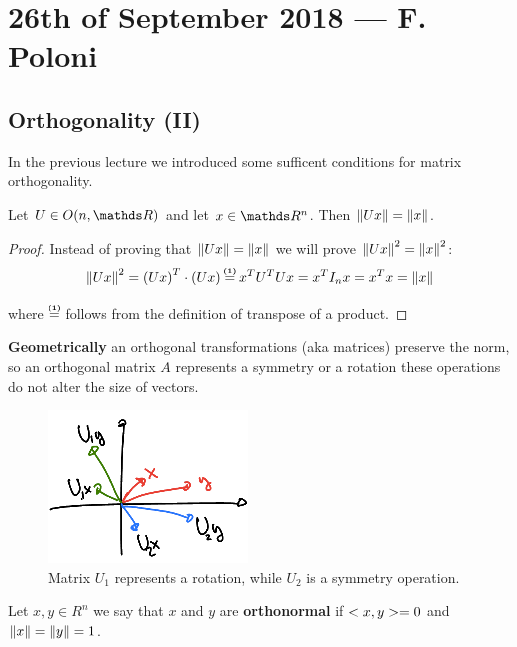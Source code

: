 \documentclass[computationalMathematics.tex]{subfiles}
\begin{document}
\chapter{26th of September 2018 --- F. Poloni}

\section{Orthogonality (II)}
In the previous lecture we introduced some sufficent conditions for matrix orthogonality.

\begin{theorem}
  Let $U \in O(n, \R)$ and let $x \in \R^n$. Then $\left\lVert Ux\right\rVert = \left\lVert x\right\rVert$.
\end{theorem}

\begin{proof}
  Instead of proving that $\left\lVert Ux\right\rVert = \left\lVert x\right\rVert$ we will prove $\left\lVert Ux\right\rVert^2 = \left\lVert x\right\rVert^2$:\\
  
  \[
    \norm{Ux}^2 = \tr{(Ux)} \cdot (Ux) \numeq{(1)} \tr{x} \tr{U} U x = \tr{x} I_n x = \tr{x} x = \norm{x}
  \]

  where $\numeq{(1)}$ follows from the definition of transpose of a product.
\end{proof}

\textbf{Geometrically} an orthogonal transformations (aka matrices) preserve the norm, so an orthogonal matrix $A$ represents a symmetry or a rotation these operations do not alter the size of vectors.

\begin{figure}[H]
    \centering
    \includegraphics[scale = 2]{pics/26sett/orthgonal.png}
    \caption{Matrix $U_1$ represents a rotation, while $U_2$ is a symmetry operation.}\label{fig:26sett_ortho}
\end{figure}

\begin{definition}[Orthonormality]
  Let $x, y \in R^n$ we say that $x$ and $y$ are \textbf{orthonormal} if $<x, y> = 0$ and $\left\lVert x\right\rVert = \left\lVert y\right\rVert = 1$.
\end{definition}
\end{document}
